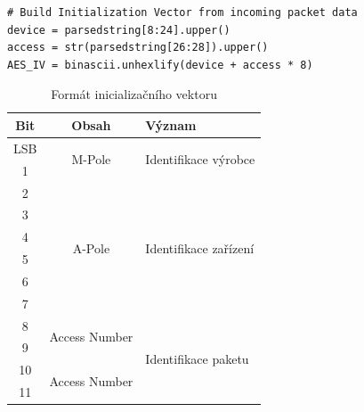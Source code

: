 \begin{lstlisting}[caption={Sestavení inicializačního vektoru},captionpos=b,label=CodeIV,style=MyCodePython]
# Build Initialization Vector from incoming packet data
device = parsedstring[8:24].upper()
access = str(parsedstring[26:28]).upper()
AES_IV = binascii.unhexlify(device + access * 8)
\end{lstlisting}

\begin{table}[!ht]
  \caption{Formát inicializačního vektoru}
	\label{TabulkaInicializacniVektor}
	\vspace{-10pt}
	\begin{center}
\begin{tabular}{|c|c|l|}
\hline
\textbf{Bit} & \textbf{Obsah}                 & \textbf{Význam}                        \\ \hline \hline
LSB          & \multirow{2}{*}{M-Pole}        & \multirow{2}{*}{Identifikace výrobce}  \\ \cline{1-1}
1            &                                &                                        \\ \hline
2            & \multirow{6}{*}{A-Pole}        & \multirow{6}{*}{Identifikace zařízení} \\ \cline{1-1}
3            &                                &                                        \\ \cline{1-1}
4            &                                &                                        \\ \cline{1-1}
5            &                                &                                        \\ \cline{1-1}
6            &                                &                                        \\ \cline{1-1}
7            &                                &                                        \\ \hline
8            & \multirow{2}{*}{Access Number} & \multirow{8}{*}{Identifikace paketu}   \\ \cline{1-1}
9            &                                &                                        \\ \cline{1-2}
10           & \multirow{2}{*}{Access Number} &                                        \\ \cline{1-1}
11           &                                &                                        \\ \cline{1-2}

\end{tabular}
\end{center}
\end{table}
